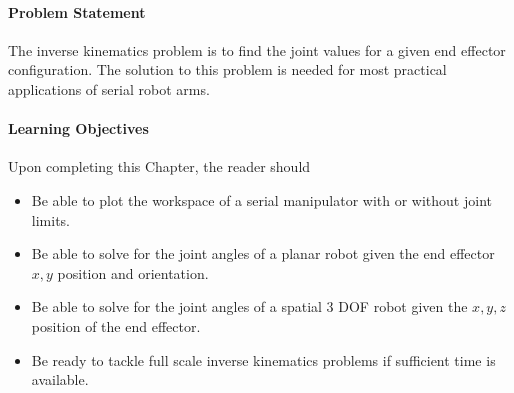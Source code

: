 \paragraph{Problem Statement}
  
The inverse kinematics problem is to find the joint values for a given end effector configuration.  The solution to this problem is needed for most practical applications of serial robot arms. 

  
\paragraph{Learning Objectives}
Upon completing this Chapter, the reader should

\begin{itemize}
	\item Be able to plot the workspace of a serial manipulator with or without joint limits.
	\item Be able to solve for the joint angles of a planar robot given the end effector $x,y$ position and orientation.
	\item Be able to solve for the joint angles of a spatial 3 DOF robot given the $x,y,z$ position of the end effector.
	\item Be ready to tackle full scale inverse kinematics problems if sufficient time is available. 
\end{itemize}